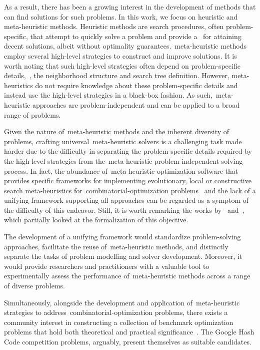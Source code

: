 As a result, there has been a growing interest in the development of methods
that can find  solutions for such problems. In this work, we
focus on heuristic and meta-heuristic methods. Heuristic methods are search
procedures, often problem-specific, that attempt to quickly solve a problem and
provide a~ for attaining decent solutions, albeit
without optimality guarantees.~\acrfull{meta-heuristic} methods employ several
high-level strategies to construct and improve solutions. It is worth noting
that such high-level strategies often depend on problem-specific details,~\eg{},
the neighborhood structure and search tree definition. However, meta-heuristics
do not require knowledge about these problem-specific details and instead use
the high-level strategies in a black-box fashion. As
such,~\acrshort{meta-heuristic} approaches are problem-independent and can be
applied to a broad range of problems.

Given the nature of~\acrshort{meta-heuristic} methods and the inherent diversity
of problems, crafting universal~\acrshort{meta-heuristic} solvers is a
challenging task made harder due to the difficulty in separating the
problem-specific details required by the high-level strategies from
the~\acrshort{meta-heuristic} problem-independent solving process. In fact, the
abundance of~\acrshort{meta-heuristic} optimization software that provides
specific frameworks for implementing evolutionary, local or constructive search
meta-heuristics for~\acrshort{combinatorial-optimization}
problems~\cite{cahon2004paradiseoa,digaspero2003easylocal,durillo2011jmetal} and
the lack of a unifying framework supporting all approaches can be regarded as a
symptom of the difficulty of this endeavor. Still, it is worth remarking the
works by~\citet{vieira2009uma} and~\citet{outeiro2021application},
which partially looked at the formalization of this objective.

The development of a unifying framework would standardize problem-solving
approaches, facilitate the reuse of~\acrshort{meta-heuristic} methods, and
distinctly separate the tasks of problem modelling and solver development.
Moreover, it would provide researchers and practitioners with a valuable tool to
experimentally assess the performance of~\acrshort{meta-heuristic} methods
across a range of diverse problems.

Simultaneously, alongside the development and application
of~\acrshort{meta-heuristic} strategies to
address~\acrshort{combinatorial-optimization} problems, there exists a community
interest in constructing a collection of benchmark optimization problems that
hold both theoretical and practical
significance~\cite{bartz-beielstein2020benchmarking}. The Google Hash Code
competition problems, arguably, present themselves as suitable candidates.


